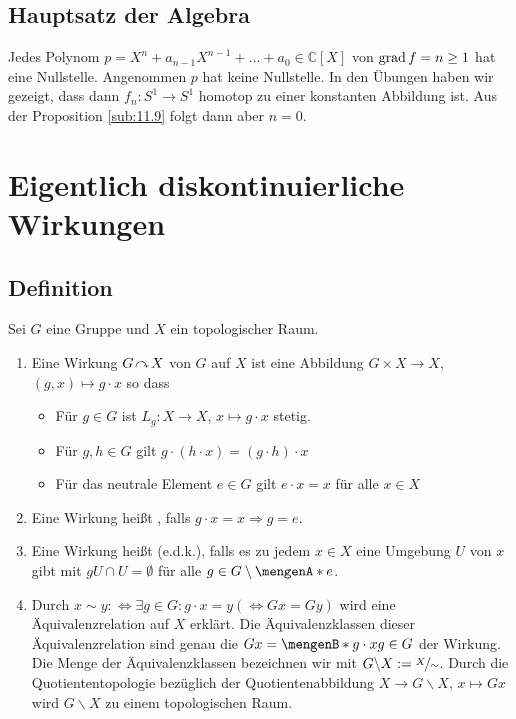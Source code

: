 \subsection{Hauptsatz der Algebra} %
\label{sub:1121}
Jedes Polynom $p = X^n + a_{n-1} X^{n-1} + \ldots  + a_0 \in \mathds{C}[X]$ von $\operatorname{grad} f = n \ge 1$ hat eine Nullstelle.
Angenommen $p$ hat keine Nullstelle. In den Übungen haben wir gezeigt,
dass dann $f_n : S^1 \to S^1$ homotop zu einer konstanten Abbildung ist. Aus der Proposition 
\ref{sub:11.9} folgt dann aber $n=0$. \bewende
\newpage

\section{Eigentlich diskontinuierliche Wirkungen} %
\label{sec:12}

\subsection[Definition: Eigentlich diskontinuierliche Wirkung]{Definition} %
\label{sub:12.1}
Sei $G$ eine Gruppe und $X$ ein topologischer Raum.
\begin{enumerate}[(1)]
	\item Eine Wirkung $G \!\curvearrowright\! X$ von $G$ auf $X$ ist eine Abbildung $G \times X \to X$, $(g,x) \mapsto g \cdot x$ so dass
	\begin{itemize}
		\item Für $g \in G$ ist $L_g : X \to X$, $x \mapsto g \cdot x$ stetig.
		\item Für $g,h \in G$ gilt $g \cdot (h \cdot x)= (g \cdot h) \cdot x$
		\item Für das neutrale Element $e \in G$ gilt $e \cdot x = x$ für alle $x \in X$
	\end{itemize}
	\item Eine Wirkung heißt , falls $g \cdot x = x \Rightarrow g = e$.
	\item Eine Wirkung heißt  (e.d.k.), falls es zu jedem $x \in X$ eine Umgebung $U$ von $x$
	gibt mit $g U\cap U = \emptyset$ für alle $g \in G \setminus \set{e}$.
	\item Durch $x \sim y :\Leftrightarrow \exists g \in G : g \cdot x = y (\Leftrightarrow G x = G y)$ wird eine 
	Äquivalenzrelation auf $X$ erklärt. Die Äquivalenzklassen dieser Äquivalenzrelation sind genau die  $Gx =\set[g\cdot x]{g \in G}$ der Wirkung.
	Die Menge der Äquivalenzklassen bezeichnen wir mit $G \backslash X := \nicefrac{X}{\sim}$. Durch die Quotiententopologie bezüglich der Quotientenabbildung $X \to G\backslash X$, $x \mapsto G x$ wird $G \backslash X$ zu einem topologischen Raum.
\end{enumerate}

